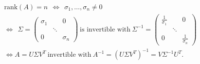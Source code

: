 {
\color{solution}
\begin{align*}
&\text{rank}(A)=n\ \ \Leftrightarrow\ \ \sigma_1,\dots,\sigma_n\neq 0\\
& \Leftrightarrow\ \ \Sigma 
= \begin{pmatrix}\sigma_1& &0\\ &\ddots& \\0& &\sigma_n\end{pmatrix} \ \text{is invertible with}\  \Sigma^{-1} 
= \begin{pmatrix}\frac{1}{\sigma_1}& &0\\ &\ddots& \\0& &\frac{1}{\sigma_n}\end{pmatrix}\\
& \Leftrightarrow A=U\Sigma V^T\  \text{invertible with}\ A^{-1}=(U\Sigma V^T)^{-1} = V\Sigma^{-1}U^T.
\end{align*}
	
}